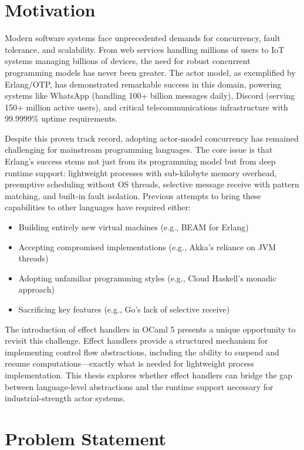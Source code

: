\documentclass[12pt,a4paper]{report}
\begin{document}
\section{Motivation}

Modern software systems face unprecedented demands for concurrency, fault tolerance, and scalability. From web services handling millions of users to IoT systems managing billions of devices, the need for robust concurrent programming models has never been greater. The actor model, as exemplified by Erlang/OTP, has demonstrated remarkable success in this domain, powering systems like WhatsApp (handling 100+ billion messages daily), Discord (serving 150+ million active users), and critical telecommunications infrastructure with 99.9999\% uptime requirements.

Despite this proven track record, adopting actor-model concurrency has remained challenging for mainstream programming languages. The core issue is that Erlang's success stems not just from its programming model but from deep runtime support: lightweight processes with sub-kilobyte memory overhead, preemptive scheduling without OS threads, selective message receive with pattern matching, and built-in fault isolation. Previous attempts to bring these capabilities to other languages have required either:

\begin{itemize}
\item Building entirely new virtual machines (e.g., BEAM for Erlang)
\item Accepting compromised implementations (e.g., Akka's reliance on JVM threads)
\item Adopting unfamiliar programming styles (e.g., Cloud Haskell's monadic approach)
\item Sacrificing key features (e.g., Go's lack of selective receive)
\end{itemize}

The introduction of effect handlers in OCaml 5 presents a unique opportunity to revisit this challenge. Effect handlers provide a structured mechanism for implementing control flow abstractions, including the ability to suspend and resume computations—exactly what is needed for lightweight process implementation. This thesis explores whether effect handlers can bridge the gap between language-level abstractions and the runtime support necessary for industrial-strength actor systems.

\section{Problem Statement}
\end{document}
